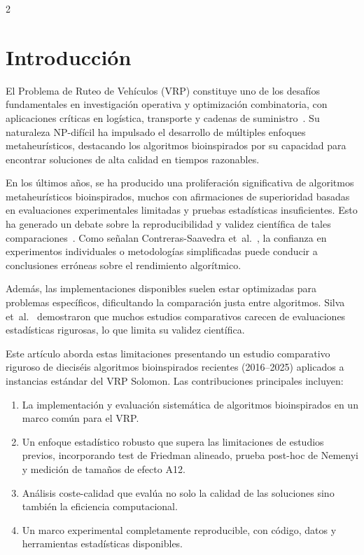 \documentclass[10pt,a4paper]{extarticle}
\begin{document}
\vspace{1em}
\begin{multicols}{2}

\section{Introducción}
El Problema de Ruteo de Vehículos (VRP) constituye uno de los desafíos fundamentales en investigación operativa y optimización combinatoria, con aplicaciones críticas en logística, transporte y cadenas de suministro~\cite{Mirjalili2016WOA}. Su naturaleza NP-difícil ha impulsado el desarrollo de múltiples enfoques metaheurísticos, destacando los algoritmos bioinspirados por su capacidad para encontrar soluciones de alta calidad en tiempos razonables.

En los últimos años, se ha producido una proliferación significativa de algoritmos metaheurísticos bioinspirados, muchos con afirmaciones de superioridad basadas en evaluaciones experimentales limitadas y pruebas estadísticas insuficientes. Esto ha generado un debate sobre la reproducibilidad y validez científica de tales comparaciones~\cite{Li2020SMA}. Como señalan Contreras-Saavedra et~al.~\cite{Contreras2024CD}, la confianza en experimentos individuales o metodologías simplificadas puede conducir a conclusiones erróneas sobre el rendimiento algorítmico.

Además, las implementaciones disponibles suelen estar optimizadas para problemas específicos, dificultando la comparación justa entre algoritmos. Silva et~al.~\cite{Silva2023VRP} demostraron que muchos estudios comparativos carecen de evaluaciones estadísticas rigurosas, lo que limita su validez científica.

Este artículo aborda estas limitaciones presentando un estudio comparativo riguroso de dieciséis algoritmos bioinspirados recientes (2016--2025) aplicados a instancias estándar del VRP Solomon. Las contribuciones principales incluyen:

\begin{enumerate}
\item La implementación y evaluación sistemática de algoritmos bioinspirados en un marco común para el VRP.
\item Un enfoque estadístico robusto que supera las limitaciones de estudios previos, incorporando test de Friedman alineado, prueba post-hoc de Nemenyi y medición de tamaños de efecto A12.
\item Análisis coste-calidad que evalúa no solo la calidad de las soluciones sino también la eficiencia computacional.
\item Un marco experimental completamente reproducible, con código, datos y herramientas estadísticas disponibles.
\end{enumerate}


\end{multicols}
\end{document}
